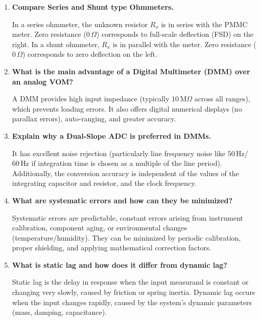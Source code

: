 \documentclass[12pt,a4paper]{article}
\newcommand{\Q}[1]{\textbf{#1}\par\noindent\ignorespaces}
\begin{document}
\begin{tcolorbox}[exambox, title={\textbf{Frequently Asked / Viva Questions}}]
\begin{enumerate}[topsep=0pt, label=\textbf{Q\arabic*.}, itemsep=5pt]
  \item \Q{Compare Series and Shunt type Ohmmeters.}
    In a series ohmmeter, the unknown resistor $R_x$ is in series with the PMMC meter. Zero resistance ($0\,\Omega$) corresponds to full-scale deflection (FSD) on the right. In a shunt ohmmeter, $R_x$ is in parallel with the meter. Zero resistance ($0\,\Omega$) corresponds to zero deflection on the left.
  \item \Q{What is the main advantage of a Digital Multimeter (DMM) over an analog VOM?}
    A DMM provides high input impedance (typically $10\,\text{M}\Omega$ across all ranges), which prevents loading errors. It also offers digital numerical displays (no parallax errors), auto-ranging, and greater accuracy.
  \item \Q{Explain why a Dual-Slope ADC is preferred in DMMs.}
    It has excellent noise rejection (particularly line frequency noise like $50\,\text{Hz}$/ $60\,\text{Hz}$ if integration time is chosen as a multiple of the line period). Additionally, the conversion accuracy is independent of the values of the integrating capacitor and resistor, and the clock frequency.
  \item \Q{What are systematic errors and how can they be minimized?}
    Systematic errors are predictable, constant errors arising from instrument calibration, component aging, or environmental changes (temperature/humidity). They can be minimized by periodic calibration, proper shielding, and applying mathematical correction factors.
  \item \Q{What is static lag and how does it differ from dynamic lag?}
    Static lag is the delay in response when the input measurand is constant or changing very slowly, caused by friction or spring inertia. Dynamic lag occurs when the input changes rapidly, caused by the system's dynamic parameters (mass, damping, capacitance).
\end{enumerate}
\end{tcolorbox}
\end{document}
